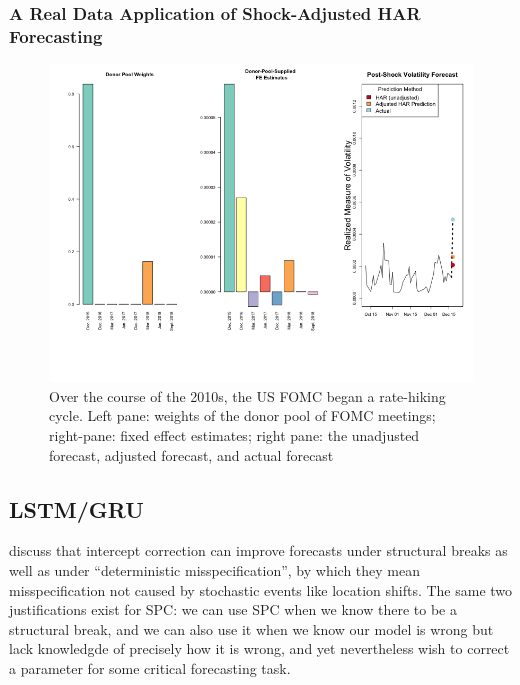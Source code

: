 \documentclass[11pt]{article}
\theoremstyle{definition}
\begin{document}
\subsubsection{A Real Data Application of Shock-Adjusted HAR Forecasting}

\begin{figure}[h!]
  \begin{center}
    \includegraphics[scale=.4]{real_data_output_plots/savetime_SatJun151644072024__^VIX-^IRX-^XAU_^VIX_2018-12-18-2015-12-15-2016-12-13-2017-03-14-2017-06-13-2017-12-12-2018-03-20-2018-06-12-2018-09-25.png}
    \caption{Over the course of the 2010s, the US FOMC began a rate-hiking cycle.  Left pane: weights of the donor pool of FOMC meetings; right-pane: fixed effect estimates; right pane: the unadjusted forecast, adjusted forecast, and actual forecast}
    \label{fig:six_plots}
    \end{center}
  \end{figure}

\subsection{LSTM/GRU}

\cite{hendry2004pooling} discuss that intercept correction can improve forecasts under structural breaks as well as under ``deterministic misspecification'', by which they mean misspecification not caused by stochastic events like location shifts.  The same two justifications exist for SPC: we can use SPC when we know there to be a structural break, and we can also use it when we know our model is wrong but lack knowledgde of precisely how it is wrong, and yet nevertheless wish to correct a parameter for some critical forecasting task.
\end{document}

